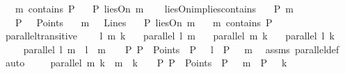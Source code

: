 \begin{isabellebody}
\ \ \ {\isachardoublequoteopen}m\ contains\ P{\isachardoublequoteclose}\isanewline
\ \ \ {\isachardoublequoteopen}P\ liesOn\ m{\isachardoublequoteclose}\isanewline
%
\isadelimproof
\ \ %
\endisadelimproof
%
\isatagproof
{}\isamarkupfalse%
%
\endisatagproof
{\isafoldproof}%
%
\isadelimproof
\isanewline
%
\endisadelimproof
\isanewline
{}\isamarkupfalse%
\ liesOn{\isacharunderscore}{\kern0pt}implies{\isacharunderscore}{\kern0pt}contains{\isacharcolon}{\kern0pt}\isanewline
\ \ \ P\ m\isanewline
\ \ \ {\isachardoublequoteopen}P\ \ {\isasymin}\ Points{\isachardoublequoteclose}\isanewline
\ \ \ {\isachardoublequoteopen}m\ \ {\isasymin}\ Lines{\isachardoublequoteclose}\isanewline
\ \ \ {\isachardoublequoteopen}P\ liesOn\ m{\isachardoublequoteclose}\isanewline
\ \ \ {\isachardoublequoteopen}m\ contains\ P{\isachardoublequoteclose}\isanewline
%
\isadelimproof
\ \ %
\endisadelimproof
%
\isatagproof
{}\isamarkupfalse%
%
\endisatagproof
{\isafoldproof}%
%
\isadelimproof
\isanewline
%
\endisadelimproof
\isanewline
{}\isamarkupfalse%
\ parallel{\isacharunderscore}{\kern0pt}transitive{\isacharcolon}{\kern0pt}\ \isanewline
\ \ \ l\ m\ k\isanewline
\ \ \ {\isachardoublequoteopen}parallel\ l\ m{\isachardoublequoteclose}\isanewline
\ \ \ {\isachardoublequoteopen}parallel\ m\ k{\isachardoublequoteclose}\isanewline
\ \ \ {\isachardoublequoteopen}parallel\ l\ k{\isachardoublequoteclose}\isanewline
%
\isadelimproof
%
\endisadelimproof
%
\isatagproof
{}\isamarkupfalse%
\ {\isacharminus}{\kern0pt}\isanewline
\ \ \isamarkupfalse%
\ {}{\isacharcolon}{\kern0pt}\ {\isachardoublequoteopen}parallel\ l\ m\ {\isacharequal}{\kern0pt}\ {\isacharparenleft}{\kern0pt}{\isacharparenleft}{\kern0pt}l\ {\isacharequal}{\kern0pt}\ m{\isacharparenright}{\kern0pt}\ {\isasymor}\ {\isasymnot}\ {\isacharparenleft}{\kern0pt}{\isasymexists}\ P{\isachardot}{\kern0pt}\ P\ {\isasymin}\ Points\ {\isasymand}\ P\ {\isasymlhd}\ \ l\ {\isasymand}\ P\ {\isasymlhd}\ \ m{\isacharparenright}{\kern0pt}{\isacharparenright}{\kern0pt}{\isachardoublequoteclose}\ \isamarkupfalse%
\ assms\ parallel{\isacharunderscore}{\kern0pt}def\ \isamarkupfalse%
\ auto\isanewline
\ \ \isamarkupfalse%
\ {}{\isacharcolon}{\kern0pt}\ {\isachardoublequoteopen}parallel\ m\ k\ {\isacharequal}{\kern0pt}\ {\isacharparenleft}{\kern0pt}{\isacharparenleft}{\kern0pt}m\ {\isacharequal}{\kern0pt}\ k{\isacharparenright}{\kern0pt}\ {\isasymor}\ {\isasymnot}\ {\isacharparenleft}{\kern0pt}{\isasymexists}\ P{\isachardot}{\kern0pt}\ P\ {\isasymin}\ Points\ {\isasymand}\ P\ {\isasymlhd}\ \ m\ {\isasymand}\ P\ {\isasymlhd}\ \ k{\isacharparenright}{\kern0pt}{\isacharparenright}{\kern0pt}{\isachardoublequoteclose}\ \isamarkupfalse%

\end{isabellebody}

